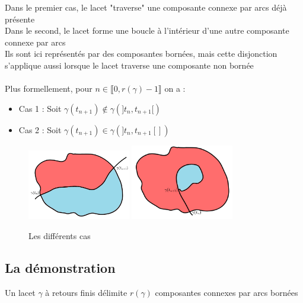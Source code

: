 \documentclass{article}
\begin{document}
\begin{flushleft}
Dans le premier cas, le lacet "traverse" une composante connexe par arcs déjà présente\\
Dans le second, le lacet forme une boucle à l'intérieur d'une autre composante connexe par arcs\\
Ils sont ici représentés par des composantes bornées, mais cette disjonction s'applique aussi lorsque le lacet traverse une composante
non bornée
\\~\\
Plus formellement, pour $n \in \llbracket 0, r(\gamma) -1 \rrbracket$ on a :
\begin{itemize}
    \item Cas 1 : Soit $\gamma(t_{n+1}) \notin \gamma(]t_n, t_{n+1}[)$\\
    \item Cas 2 : Soit $\gamma(t_{n+1}) \in \gamma(]t_n, t_{n+1}[])$
\end{itemize}

\begin{figure}[h]
    \caption{Les différents cas}
    \centering
    \includegraphics*[width=0.4\textwidth]{Cas 1.png}
    \includegraphics*[width=0.4\textwidth]{Cas 2.png}
\end{figure}

\vspace*{3cm}

\subsection{La démonstration}

\begin{tcolorbox}[colback=purple!20!white, colframe=purple!60!white, title = Théorème des retours]
    Un lacet $\gamma$ à retours finis délimite $r(\gamma)$ composantes connexes par arcs bornées
\end{tcolorbox}


\end{flushleft}
\end{document}
